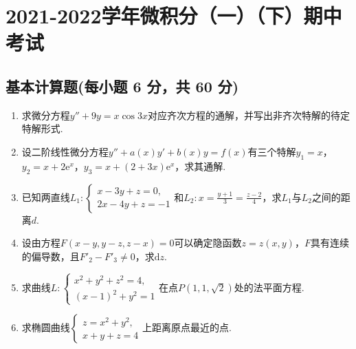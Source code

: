 \documentclass[../Main.tex]{subfiles}
\begin{document}
\chapter{2021-2022学年微积分（一）（下）期中考试}

\section{基本计算题(每小题 6 分，共 60 分)}
\begin{enumerate}
    \item 求微分方程$y''+9y=x\cos 3x$对应齐次方程的通解，并写出非齐次特解的待定特解形式.
          \vspace{10em}

    \item 设二阶线性微分方程$y''+a(x)y'+b(x)y=f(x)$有三个特解$y_{1}=x$，$y_{2}=x+
              2\mathrm{e}^{x}$，$y_{3}=x+(2+3x)\mathrm{e}^{x}$，求其通解.
          \vspace{11em}

    \item 已知两直线$L_{1}:
              \begin{cases}
                  x-3y+z=0, \\
                  2x-4y+z=-1
              \end{cases}$和$L_{2}:x=\frac{y+1}{3}=\frac{z-2}{4}$，求$L_{1}$与$L_{2}$之间的距离$d$.
          \vspace{11em}

    \item 设由方程$F(x-y,y-z,z-x)=0$可以确定隐函数$z=z(x,y)$，$F$具有连续的偏导数，且$F
              '_{2}-F'_{3}\neq0$，求$\mathrm{d}z$.
          \vspace{13em}

    \item 求曲线$L:
              \begin{cases}
                  x^{2}+y^{2}+z^{2}=4, \\
                  (x-1)^{2}+y^{2}=1
              \end{cases}$在点$P\left(1,1,\sqrt{2}\right)$处的法平面方程.
          \vspace{12em}

    \item 求椭圆曲线$\begin{cases}
                  z=x^{2}+y^{2}, \\
                  x+y+z=4
              \end{cases}$上距离原点最近的点.
          \vspace{12em}


\end{enumerate}
\end{document}
